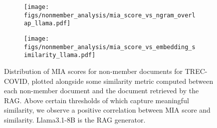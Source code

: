 \begin{figure*}[t]
    \centering
    \begin{subfigure}[t]{0.48\textwidth}
        \centering
        \texttt{[image: figs/nonmember\_analysis/mia\_score\_vs\_ngram\_overlap\_llama.pdf]}
    \end{subfigure}
    \begin{subfigure}[t]{0.48\textwidth}
        \centering
        \texttt{[image: figs/nonmember\_analysis/mia\_score\_vs\_embedding\_similarity\_llama.pdf]}
    \end{subfigure}
    \caption{Distribution of MIA scores for non-member documents for TREC-COVID, plotted alongside some similarity metric computed between each non-member document and the document retrieved by the RAG. Above certain thresholds of which capture meaningful similarity, we observe a positive correlation between MIA score and similarity. Llama3.1-8B is the RAG generator.}
\label{fig:nonmember_score_similarity_llama}
\end{figure*}
